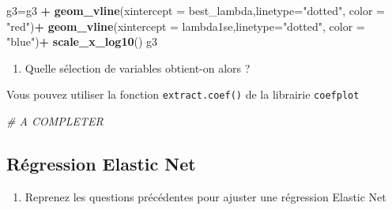 \documentclass[
]{article}
\newenvironment{Shaded}{\begin{snugshade}}{\end{snugshade}}
\newcommand{\AttributeTok}[1]{\textcolor[rgb]{0.13,0.29,0.53}{#1}}
\newcommand{\CommentTok}[1]{\textcolor[rgb]{0.56,0.35,0.01}{\textit{#1}}}
\newcommand{\FunctionTok}[1]{\textcolor[rgb]{0.13,0.29,0.53}{\textbf{#1}}}
\newcommand{\NormalTok}[1]{#1}
\newcommand{\OtherTok}[1]{\textcolor[rgb]{0.56,0.35,0.01}{#1}}
\newcommand{\SpecialCharTok}[1]{\textcolor[rgb]{0.81,0.36,0.00}{\textbf{#1}}}
\newcommand{\StringTok}[1]{\textcolor[rgb]{0.31,0.60,0.02}{#1}}
\providecommand{\tightlist}{%
  \setlength{\itemsep}{0pt}\setlength{\parskip}{0pt}}
\begin{document}
\begin{Shaded}
\begin{Highlighting}[]
\NormalTok{g3}\OtherTok{=}\NormalTok{g3 }\SpecialCharTok{+} 
  \FunctionTok{geom\_vline}\NormalTok{(}\AttributeTok{xintercept =}\NormalTok{ best\_lambda,}\AttributeTok{linetype=}\StringTok{"dotted"}\NormalTok{, }\AttributeTok{color =} \StringTok{"red"}\NormalTok{)}\SpecialCharTok{+}
  \FunctionTok{geom\_vline}\NormalTok{(}\AttributeTok{xintercept =}\NormalTok{ lambda1se,}\AttributeTok{linetype=}\StringTok{"dotted"}\NormalTok{, }\AttributeTok{color =} \StringTok{"blue"}\NormalTok{)}\SpecialCharTok{+}
  \FunctionTok{scale\_x\_log10}\NormalTok{()}
\NormalTok{g3}
\end{Highlighting}
\end{Shaded}

\begin{enumerate}
\def\labelenumi{\arabic{enumi}.}
\setcounter{enumi}{3}
\tightlist
\item
  Quelle sélection de variables obtient-on alors ?
\end{enumerate}

Vous pouvez utiliser la fonction \texttt{extract.coef()} de la librairie
\texttt{coefplot}

\begin{Shaded}
\begin{Highlighting}[]
\CommentTok{\# A COMPLETER}
\end{Highlighting}
\end{Shaded}

\hypertarget{ruxe9gression-elastic-net}{%
\subsection{Régression Elastic Net}\label{ruxe9gression-elastic-net}}

\begin{enumerate}
\def\labelenumi{\arabic{enumi}.}
\tightlist
\item
  Reprenez les questions précédentes pour ajuster une régression Elastic
  Net
\end{enumerate}
\end{document}
